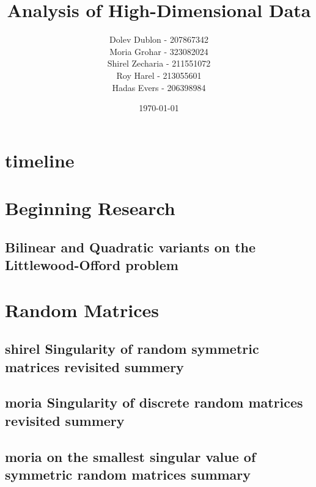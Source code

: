\documentclass[12pt]{article}
\title{\textbf{Analysis of High-Dimensional Data}}
\author{
    Dolev Dublon - 207867342\\
    Moria Grohar - 323082024\\ 
    Shirel Zecharia - 211551072\\
    Roy Harel - 213055601\\
    Hadas Evers - 206398984 
}
\date{\today}
\begin{document}
\maketitle


\tableofcontents

\newpage





\section{timeline}




\section{Beginning Research}

\subsection{Bilinear and Quadratic variants on the Littlewood-Offord problem}



\section{Random Matrices}








\subsection{shirel Singularity of random symmetric matrices revisited summery}



\subsection{moria Singularity of discrete random matrices revisited summery}



\subsection{moria on the smallest singular value of symmetric random matrices summary}
\end{document}
